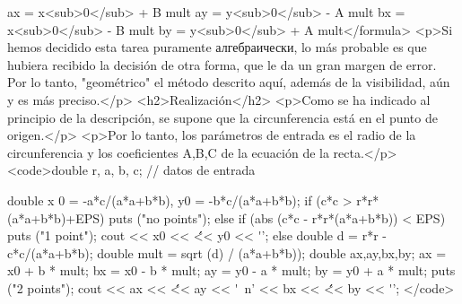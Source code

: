 ax = x<sub>0</sub> + B mult
ay = y<sub>0</sub> - A mult
bx = x<sub>0</sub> - B mult
by = y<sub>0</sub> + A mult</formula>
<p>Si hemos decidido esta tarea puramente алгебраически, lo más probable es que hubiera recibido la decisión de otra forma, que le da un gran margen de error. Por lo tanto, "geométrico" el método descrito aquí, además de la visibilidad, aún y es más preciso.</p>
<h2>Realización</h2>
<p>Como se ha indicado al principio de la descripción, se supone que la circunferencia está en el punto de origen.</p>
<p>Por lo tanto, los parámetros de entrada es el radio de la circunferencia y los coeficientes A,B,C de la ecuación de la recta.</p>
<code>double r, a, b, c; // datos de entrada

double x 0 = -a*c/(a*a+b*b), y0 = -b*c/(a*a+b*b);
if (c*c > r*r*(a*a+b*b)+EPS)
puts ("no points");
else if (abs (c*c - r*r*(a*a+b*b)) < EPS) {
puts ("1 point");
cout << x0 << \' \' << y0 << \'\n\n';
}
else {
double d = r*r - c*c/(a*a+b*b);
double mult = sqrt (d) / (a*a+b*b));
double ax,ay,bx,by;
ax = x0 + b * mult;
bx = x0 - b * mult;
ay = y0 - a * mult;
by = y0 + a * mult;
puts ("2 points");
cout << ax << \' \' << ay << \'\n\ n' << bx << \' \' << by << \'\n\n';
}</code>